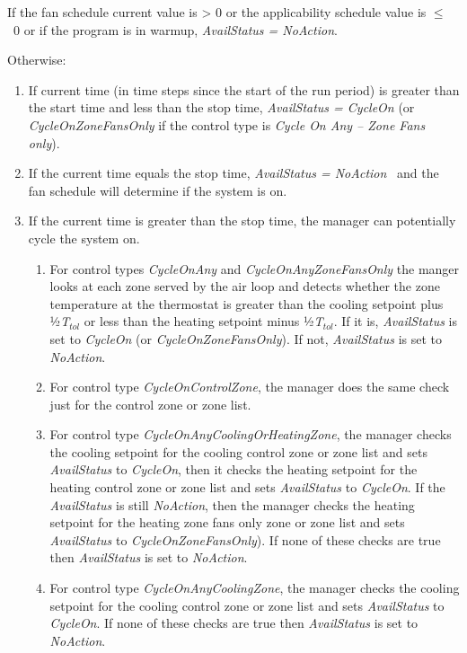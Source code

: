 If the fan schedule current value is \textgreater{} 0 or the applicability schedule value is \(\le\) ~0 or if the program is in warmup, \emph{AvailStatus = NoAction}.

Otherwise:

\begin{enumerate}
\item  If current time (in time steps since the start of the run period) is greater than the start time and less than the stop time, \emph{AvailStatus = CycleOn} (or \emph{CycleOnZoneFansOnly} if the control type is \emph{Cycle On Any -- Zone Fans only}).

\item  If the current time equals the stop time, \emph{AvailStatus = NoAction} ~and the fan schedule will determine if the system is on.

\item  If the current time is greater than the stop time, the manager can potentially cycle the system on.

  \begin{enumerate}
  \item  For control types \emph{CycleOnAny} and \emph{CycleOnAnyZoneFansOnly} the manger looks at each zone served by the air loop and detects whether the zone temperature at the thermostat is greater than the cooling setpoint plus ½\emph{T\(_{tol}\)} or less than the heating setpoint minus ½\emph{T\(_{tol}\)}. If it is, \emph{AvailStatus} is set to \emph{CycleOn} (or \emph{CycleOnZoneFansOnly}). If not, \emph{AvailStatus} is set to \emph{NoAction}.

  \item  For control type \emph{CycleOnControlZone}, the manager does the same check just for the control zone or zone list.

  \item  For control type \emph{CycleOnAnyCoolingOrHeatingZone}, the manager checks the cooling setpoint for the cooling control zone or zone list and sets \emph{AvailStatus} to \emph{CycleOn}, then it checks the heating setpoint for the heating control zone or zone list and sets \emph{AvailStatus} to \emph{CycleOn}. If the \emph{AvailStatus} is still \emph{NoAction}, then the manager checks the heating setpoint for the heating zone fans only zone or zone list and sets \emph{AvailStatus} to \emph{CycleOnZoneFansOnly}). If none of these checks are true then \emph{AvailStatus} is set to \emph{NoAction}.

  \item  For control type \emph{CycleOnAnyCoolingZone}, the manager checks the cooling setpoint for the cooling control zone or zone list and sets \emph{AvailStatus} to \emph{CycleOn}. If none of these checks are true then \emph{AvailStatus} is set to \emph{NoAction}.


\end{enumerate}
\end{enumerate}

